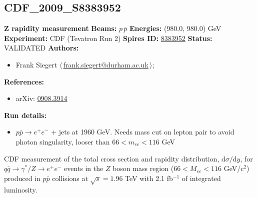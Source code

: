 \subsection[CDF\_2009\_S8383952]{CDF\_2009\_S8383952\,\cite{Aaltonen:2009pc}}
\textbf{Z rapidity measurement}\newline
\textbf{Beams:} $p$\,$\bar{p}$ \newline
\textbf{Energies:} (980.0, 980.0) GeV \newline
\textbf{Experiment:} CDF (Tevatron Run 2) \newline
\textbf{Spires ID:} \href{http://www.slac.stanford.edu/spires/find/hep/www?rawcmd=key+8383952}{8383952}\newline
\textbf{Status:} VALIDATED\newline
\textbf{Authors:}
\begin{itemize}
  \item Frank Siegert $\langle\,$\href{mailto:frank.siegert@durham.ac.uk}{frank.siegert@durham.ac.uk}$\,\rangle$;
\end{itemize}
\textbf{References:}
\begin{itemize}
  \item arXiv: \href{http://arxiv.org/abs/0908.3914}{0908.3914}
\end{itemize}
\textbf{Run details:}
\begin{itemize}

  \item $p \bar{p} \to e^+ e^-$ + jets at 1960 GeV. Needs mass cut on lepton pair to avoid photon singularity, looser than $66 < m_{ee} < 116$ GeV\end{itemize}

\noindent CDF measurement of the total cross section and rapidity distribution, $\mathrm{d}\sigma/\mathrm{d}y$, for $q\bar{q}\to \gamma^{*}/Z\to e^{+}e^{-}$ events in the $Z$ boson mass region ($66<M_{ee}<116$ GeV/c$^2$) produced in $p\bar{p}$ collisions at $\sqrt{s}=1.96$ TeV with 2.1 fb$^{-1}$ of integrated luminosity.

\clearpage


\clearpage

